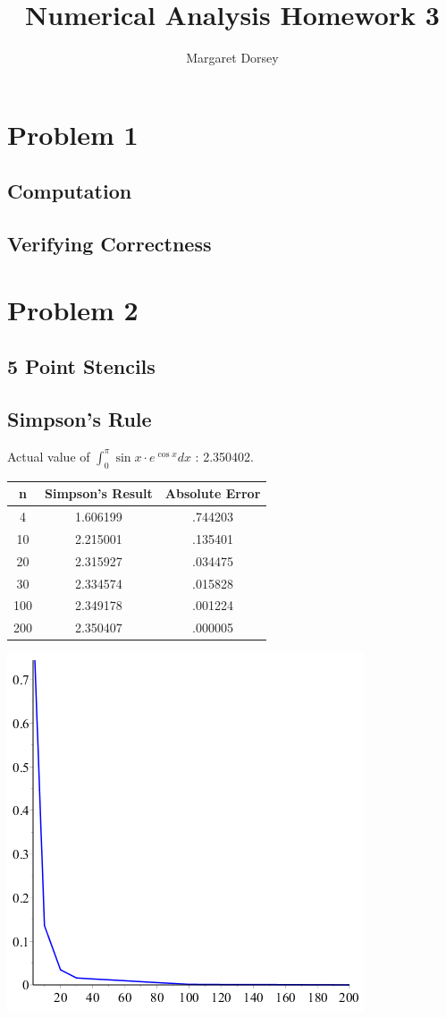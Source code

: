 \documentclass[11pt]{article} %
\title{Numerical Analysis Homework 3}
\author{Margaret Dorsey}
\begin{document}
\maketitle

\section*{Problem 1}
\subsection*{Computation}

\subsection*{Verifying Correctness}

\section*{Problem 2}
\subsection*{5 Point Stencils}

\subsection*{Simpson's Rule}
Actual value of $\int_{0}^{\pi} \sin x \cdot e^{\cos x} dx$ : 2.350402.

\begin{tabular}{c | c | c }
n & Simpson's Result & Absolute Error \\
\hline
4 & 1.606199 & .744203 \\
10 & 2.215001 & .135401 \\
20 & 2.315927&  .034475\\
30 & 2.334574&  .015828\\
100 & 2.349178 & .001224 \\
200 & 2.350407 & .000005 \\
\end{tabular}

\includegraphics[scale=.5]{plots/problem2simpsonplot.png}
\end{document}
